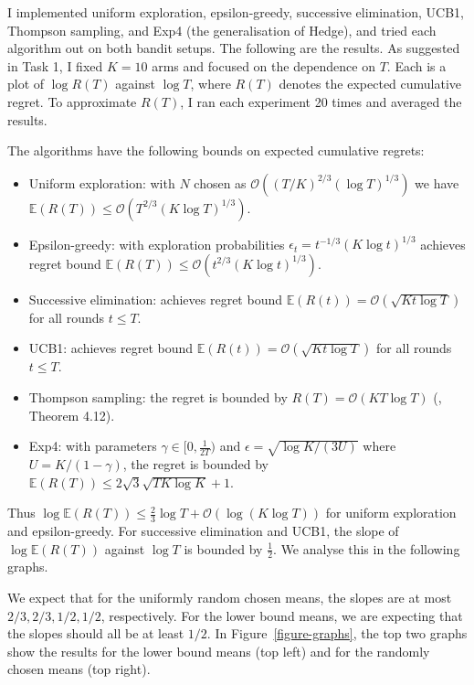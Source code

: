 \documentclass[10pt]{article}
\newcommand{\EE}{\mathbb{E}}
\newcommand{\bigoh}{\mathcal{O}}
\begin{document}
I implemented uniform exploration, epsilon-greedy, successive elimination, UCB1,
Thompson sampling, and Exp4 (the generalisation of Hedge), and tried each
algorithm out on both bandit setups. The following are the results. As suggested
in Task 1, I fixed $K = 10$ arms and focused on the dependence on $T$. Each is a
plot of $\log R(T)$ against $\log T$, where $R(T)$ denotes the expected
cumulative regret. To approximate $R(T)$, I ran each experiment 20 times and
averaged the results.

The algorithms have the following bounds on expected cumulative regrets:
\begin{itemize}
    \item Uniform exploration: with $N$ chosen as $\bigoh( (T/K)^{2/3} (\log
    T)^{1/3} )$ we have $\EE(R(T)) \le \bigoh(T^{2/3} (K \log T)^{1/3})$.
    \item Epsilon-greedy: with exploration probabilities $\epsilon_t = t^{-1/3}
    (K \log t)^{1/3}$ achieves regret bound $\EE(R(T)) \le \bigoh( t^{2/3} (K
    \log t)^{1/3} )$.
    \item Successive elimination: achieves regret bound $\EE(R(t)) =
    \bigoh(\sqrt{K t \log T})$ for all rounds $t \le T$.
    \item UCB1: achieves regret bound $\EE(R(t)) = \bigoh(\sqrt{K t \log T})$
    for all rounds $t \le T$.
    \item Thompson sampling: the regret is bounded by $R(T) = \bigoh(KT \log T)$
    (\cite{Slivkins}, Theorem 4.12).
    \item Exp4: with parameters $\gamma \in [0, \frac{1}{2T})$ and $\epsilon =
    \sqrt{\log K / (3 U)}$ where $U = K / (1-\gamma)$, the regret is bounded by
    $\EE (R(T)) \le 2 \sqrt{3} \sqrt{T K \log K} + 1$. 
\end{itemize}

Thus $\log \EE( R(T) ) \le \frac{2}{3} \log T + \bigoh(\log (K \log T))$ for
uniform exploration and epsilon-greedy. For successive elimination and UCB1, the
slope of $\log \EE( R(T))$ against $\log T$ is bounded by $\frac{1}{2}$. We
analyse this in the following graphs.

We expect that for the uniformly random chosen means, the slopes are at most
$2/3, 2/3, 1/2, 1/2$, respectively. For the lower bound means, we are expecting
that the slopes should all be at least $1/2$. In Figure~\ref{figure-graphs}, the
top two graphs show the results for the lower bound means (top left) and for the
randomly chosen means (top right).
\end{document}
